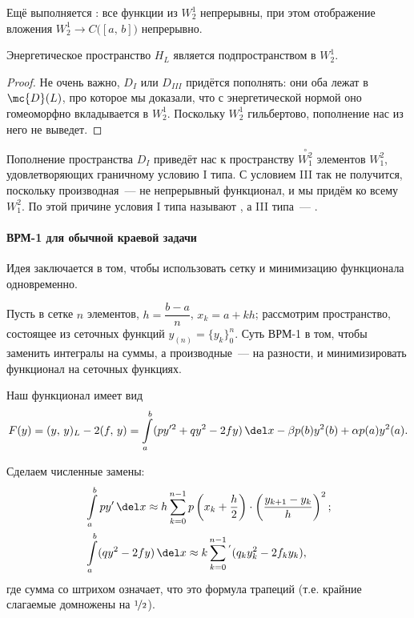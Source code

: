 \documentclass{trlnotes}
\begin{document}
    \begin{rem}
        Ещё выполняется : все функции из $W_2^1$ непрерывны, при этом отображение вложения $W_2^1 \to C\big([a, \, b]\big)$ непрерывно.
    \end{rem}

    \begin{st}
        Энергетическое пространство $H_{L}$ является подпространством в $W_2^1$.
        \begin{proof}
            Не очень важно, $D_{I}$ или $D_{III}$ придётся пополнять: они оба лежат в $\mc{D}(L)$, про которое мы доказали, что с энергетической нормой оно гомеоморфно вкладывается в $W_2^1$. Поскольку $W_2^1$ гильбертово, пополнение нас из него не выведет.
        \end{proof}
    \end{st}

    \begin{rem}
        Пополнение пространства $D_I$ приведёт нас к пространству $\overset{\circ}{W_1^2}$ элементов $W_1^2$, удовлетворяющих граничному условию I типа. С условием III так не получится, поскольку
        производная~--- не непрерывный функционал, и мы придём ко всему $W_1^2$.
        По этой причине условия I типа называют , а III типа~--- .
    \end{rem}

    \paragraph{ВРМ-1 для обычной краевой задачи}

    Идея  заключается в том, чтобы использовать сетку и минимизацию функционала одновременно. 

    Пусть в сетке $n$ элементов, $h = \dfrac{b - a}{n}$, $x_k = a + k h$; рассмотрим пространство, состоящее из сеточных функций $y_{(n)} = \{y_k\}_0^n$. Суть ВРМ-1 в том, чтобы заменить интегралы на суммы, а производные~--- на разности, и минимизировать функционал на сеточных функциях.

    Наш функционал имеет вид
    \[
        F(y) = (y, \, y)_L - 2(f, \, y) = \int\limits_a^b (py'^2 + qy^2 - 2fy) \, \del x - \beta p(b)y^2(b) + \alpha p(a)y^2(a). 
    \]

    Сделаем численные замены:
    \begin{align*}
        &\int\limits_a^b py' \, \del x \approx h \sum\limits_{k = 0}^{n - 1} p\left(x_k + \dfrac{h}{2} \right) \cdot \left(\dfrac{y_{k + 1} - y_k}{h}\right)^2; \\ 
        &\int\limits_a^b (qy^2 - 2fy) \, \del x \approx k\sum\limits_{k = 0}^{n - 1}\,\!^{'} (q_ky_k^2 - 2f_ky_k),
    \end{align*}
    где сумма со штрихом означает, что это формула трапеций (т.е. крайние слагаемые домножены на $\nicefrac{1}{2}$).
\end{document}
